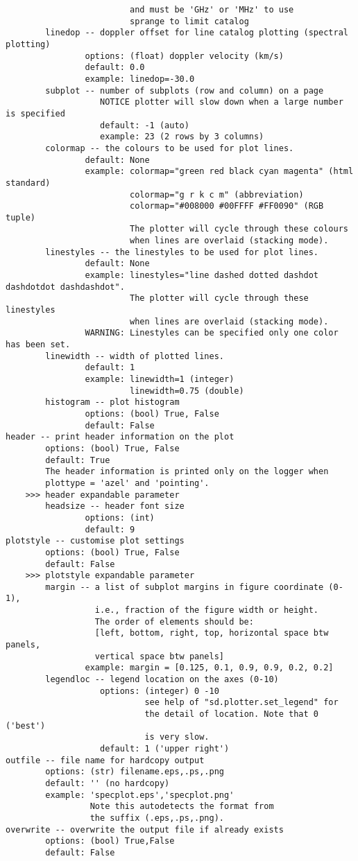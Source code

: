 \begin{verbatim}
                         and must be 'GHz' or 'MHz' to use
                         sprange to limit catalog
        linedop -- doppler offset for line catalog plotting (spectral plotting)
                options: (float) doppler velocity (km/s)
                default: 0.0
                example: linedop=-30.0
        subplot -- number of subplots (row and column) on a page
                   NOTICE plotter will slow down when a large number is specified
                   default: -1 (auto)
                   example: 23 (2 rows by 3 columns)
        colormap -- the colours to be used for plot lines. 
                default: None
                example: colormap="green red black cyan magenta" (html standard)
                         colormap="g r k c m" (abbreviation)
                         colormap="#008000 #00FFFF #FF0090" (RGB tuple)
                         The plotter will cycle through these colours 
                         when lines are overlaid (stacking mode).
        linestyles -- the linestyles to be used for plot lines. 
                default: None
                example: linestyles="line dashed dotted dashdot dashdotdot dashdashdot". 
                         The plotter will cycle through these linestyles 
                         when lines are overlaid (stacking mode). 
                WARNING: Linestyles can be specified only one color has been set. 
        linewidth -- width of plotted lines. 
                default: 1
                example: linewidth=1 (integer)
                         linewidth=0.75 (double)
        histogram -- plot histogram
                options: (bool) True, False
                default: False
header -- print header information on the plot
        options: (bool) True, False
        default: True
        The header information is printed only on the logger when 
        plottype = 'azel' and 'pointing'. 
    >>> header expandable parameter
        headsize -- header font size
                options: (int)
                default: 9
plotstyle -- customise plot settings
        options: (bool) True, False
        default: False
    >>> plotstyle expandable parameter
        margin -- a list of subplot margins in figure coordinate (0-1), 
                  i.e., fraction of the figure width or height.
                  The order of elements should be:
                  [left, bottom, right, top, horizontal space btw panels,
                  vertical space btw panels]
                example: margin = [0.125, 0.1, 0.9, 0.9, 0.2, 0.2]
        legendloc -- legend location on the axes (0-10)
                   options: (integer) 0 -10 
                            see help of "sd.plotter.set_legend" for 
                            the detail of location. Note that 0 ('best')
                            is very slow. 
                   default: 1 ('upper right')
outfile -- file name for hardcopy output
        options: (str) filename.eps,.ps,.png
        default: '' (no hardcopy)
        example: 'specplot.eps','specplot.png'
                 Note this autodetects the format from
                 the suffix (.eps,.ps,.png).
overwrite -- overwrite the output file if already exists
        options: (bool) True,False
        default: False
\end{verbatim}

